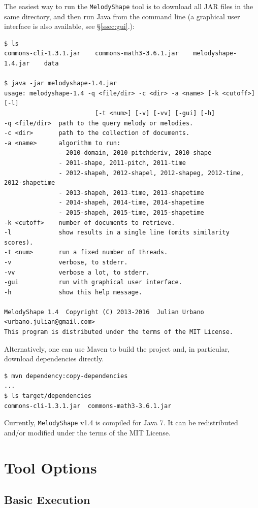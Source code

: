 \documentclass[twoside]{article}
\begin{document}
The easiest way to run the \texttt{MelodyShape} tool is to download all JAR files in the same directory, and then run Java from the command line (a graphical user interface is also available, see \S\ref{ssec:gui}.):
\begin{lstlisting}
$ ls
commons-cli-1.3.1.jar    commons-math3-3.6.1.jar    melodyshape-1.4.jar    data

$ java -jar melodyshape-1.4.jar
usage: melodyshape-1.4 -q <file/dir> -c <dir> -a <name> [-k <cutoff>] [-l]
                         [-t <num>] [-v] [-vv] [-gui] [-h]
-q <file/dir>  path to the query melody or melodies.
-c <dir>       path to the collection of documents.
-a <name>      algorithm to run:
               - 2010-domain, 2010-pitchderiv, 2010-shape
               - 2011-shape, 2011-pitch, 2011-time
               - 2012-shapeh, 2012-shapel, 2012-shapeg, 2012-time, 2012-shapetime
               - 2013-shapeh, 2013-time, 2013-shapetime
               - 2014-shapeh, 2014-time, 2014-shapetime
               - 2015-shapeh, 2015-time, 2015-shapetime
-k <cutoff>    number of documents to retrieve.
-l             show results in a single line (omits similarity scores).
-t <num>       run a fixed number of threads.
-v             verbose, to stderr.
-vv            verbose a lot, to stderr.
-gui           run with graphical user interface.
-h             show this help message.

MelodyShape 1.4  Copyright (C) 2013-2016  Julian Urbano <urbano.julian@gmail.com>
This program is distributed under the terms of the MIT License.
\end{lstlisting}

Alternatively, one can use Maven to build the project and, in particular, download dependencies directly.
\begin{lstlisting}
$ mvn dependency:copy-dependencies
...
$ ls target/dependencies
commons-cli-1.3.1.jar  commons-math3-3.6.1.jar
\end{lstlisting}

Currently, \texttt{MelodyShape} v1.4 is compiled for Java 7. It can be redistributed and/or modified under the terms of the MIT License.

\section{Tool Options}

\subsection{Basic Execution}
\end{document}
